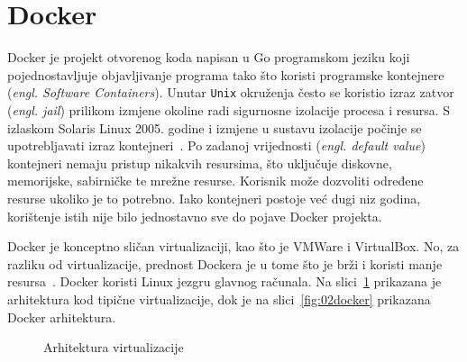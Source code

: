 \section{Docker}
Docker je projekt otvorenog koda napisan u Go programskom jeziku koji pojednostavljuje objavljivanje
programa tako što koristi programske kontejnere (\textit{engl. Software Containers}). Unutar
\texttt{Unix} okruženja često se koristio izraz zatvor (\textit{engl. jail}) prilikom izmjene
okoline radi sigurnosne izolacije procesa i resursa. S izlaskom Solaris Linux 2005.  godine i
izmjene u sustavu izolacije počinje se upotrebljavati izraz kontejneri~\citep{nickoloff2016docker}.
Po zadanoj vrijednosti (\textit{engl. default value}) kontejneri nemaju pristup nikakvih resursima,
što uključuje diskovne, memorijske, sabirničke te mrežne resurse. Korisnik može dozvoliti određene
resurse ukoliko je to potrebno. Iako kontejneri postoje već dugi niz godina, korištenje istih nije
bilo jednostavno sve do pojave Docker projekta.

Docker je konceptno sličan virtualizaciji, kao što je VMWare i VirtualBox. No, za razliku od
virtualizacije, prednost Dockera je u tome što je brži i koristi manje
resursa~\citep{leszko2017continuous}. Docker koristi Linux jezgru glavnog računala. Na
slici~\ref{fig:02vm} prikazana je arhitektura kod tipične virtualizacije, dok je na
slici~\ref{fig:02docker} prikazana Docker arhitektura.

\begin{figure}[h]
    \centering

    \caption{Arhitektura virtualizacije}%
    \label{fig:02vm}
\end{figure}

